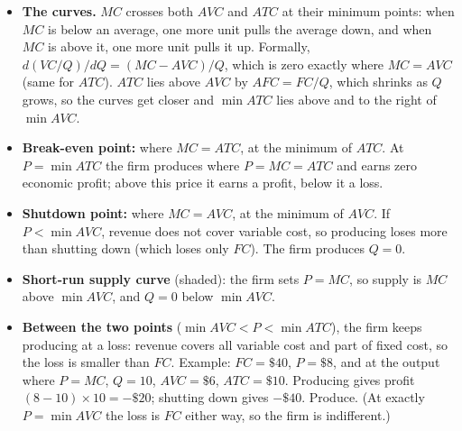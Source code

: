 \documentclass[11pt,a4paper]{article}
\begin{document}
\begin{enumerate}
\begin{solution}
\begin{itemize}\setlength{\itemsep}{0pt}
\item \textbf{The curves.} $MC$ crosses both $AVC$ and $ATC$ at their minimum points: when $MC$ is below an average, one more unit pulls the average down, and when $MC$ is above it, one more unit pulls it up. Formally, $d(VC/Q)/dQ = (MC - AVC)/Q$, which is zero exactly where $MC = AVC$ (same for $ATC$). $ATC$ lies above $AVC$ by $AFC = FC/Q$, which shrinks as $Q$ grows, so the curves get closer and $\min ATC$ lies above and to the right of $\min AVC$.
\item \textbf{Break-even point:} where $MC = ATC$, at the minimum of $ATC$. At $P = \min ATC$ the firm produces where $P = MC = ATC$ and earns zero economic profit; above this price it earns a profit, below it a loss.
\item \textbf{Shutdown point:} where $MC = AVC$, at the minimum of $AVC$. If $P < \min AVC$, revenue does not cover variable cost, so producing loses more than shutting down (which loses only $FC$). The firm produces $Q = 0$.
\item \textbf{Short-run supply curve} (shaded): the firm sets $P = MC$, so supply is $MC$ above $\min AVC$, and $Q = 0$ below $\min AVC$.
\item \textbf{Between the two points} ($\min AVC < P < \min ATC$), the firm keeps producing at a loss: revenue covers all variable cost and part of fixed cost, so the loss is smaller than $FC$. Example: $FC = \$40$, $P = \$8$, and at the output where $P = MC$, $Q = 10$, $AVC = \$6$, $ATC = \$10$. Producing gives profit $(8 - 10) \times 10 = -\$20$; shutting down gives $-\$40$. Produce. (At exactly $P = \min AVC$ the loss is $FC$ either way, so the firm is indifferent.)
\end{itemize}
\end{solution}
\end{enumerate}
\end{document}
